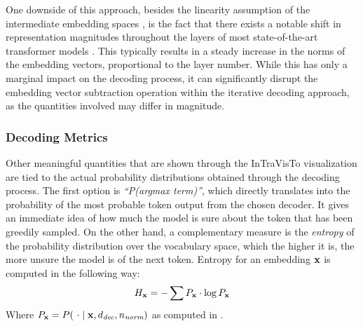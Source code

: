 One downside of this approach, besides the linearity assumption of the intermediate embedding spaces , is the fact that there exists a notable shift in representation magnitudes throughout the layers of most state-of-the-art transformer models .
This typically results in a steady increase in the norms of the embedding vectors, proportional to the layer number.
While this has only a marginal impact on the decoding process, it can significantly disrupt the embedding vector subtraction operation within the iterative decoding approach, as the quantities involved may differ in magnitude.

\subsubsection{Decoding Metrics}

Other meaningful quantities that are shown through the InTraVisTo visualization are tied to the actual probability distributions obtained through the decoding process.
The first option is \emph{``P(argmax term)''}, which directly translates into the probability of the most probable token output from the chosen decoder.
It gives an immediate idea of how much the model is sure about the token that has been greedily sampled.
On the other hand, a complementary measure is the \emph{entropy} of the probability distribution over the vocabulary space, which the higher it is, the more unsure the model is of the next token.
Entropy for an embedding $\bm{\mathbf{x}}$ is computed in the following way:
\begin{equation}
    \label{eq:method_intravisto_entropy}
    H_{\bm{\mathbf{x}}} = -\sum{P_{\bm{\mathbf{x}}} \cdot \log{P_{\bm{\mathbf{x}}}}}
\end{equation}
Where $P_{\bm{\mathbf{x}}} = P(\ \cdot \mid \bm{\mathbf{x}}, d_\textit{dec}, n_\textit{norm})$ as computed in .

